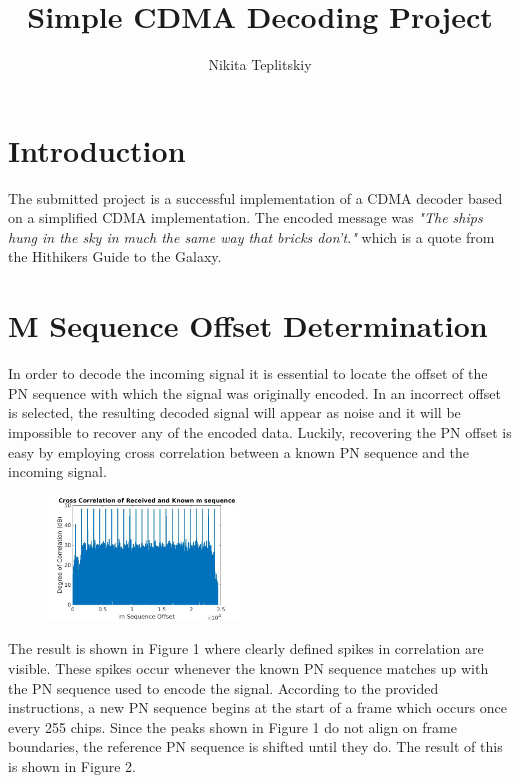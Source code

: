 \documentclass[twocolumn]{article}
\title{Simple CDMA Decoding Project}
\author{Nikita Teplitskiy }
\begin{document}
\maketitle

\section{Introduction}

The submitted project is a successful implementation of a CDMA decoder based on a simplified CDMA implementation. The encoded message was \textit{"The ships hung in the sky in much the same way that bricks don't."} which is a quote from the Hithikers Guide to the Galaxy.

\section{M Sequence Offset Determination}

In order to decode the incoming signal it is essential to locate the offset of the PN sequence with which the signal was originally encoded. In an incorrect offset is selected, the resulting decoded signal will appear as noise and it will be impossible to recover any of the encoded data. Luckily, recovering the PN offset is easy by employing cross correlation between a known PN sequence and the incoming signal. 

\begin{figure}[h]
    \centering
    \includegraphics[width=0.45\textwidth]{oldpn.jpg}
    \caption{}
    \label{fig}
\end{figure}

The result is shown in Figure 1 where clearly defined spikes in correlation are visible. These spikes occur whenever the known PN sequence matches up with the PN sequence used to encode the signal. According to the provided instructions, a new PN sequence begins at the start of a frame which occurs once every 255 chips. Since the peaks shown in Figure 1 do not align on frame boundaries, the reference PN sequence is shifted until they do. The result of this is shown in Figure 2.
\end{document}
